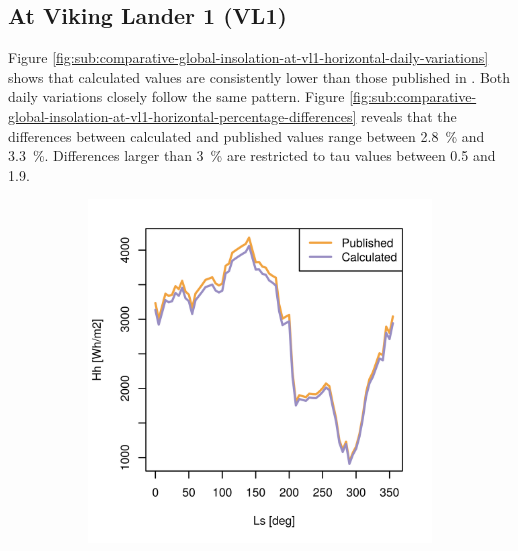 \subsection{At Viking Lander 1 (VL1)}
Figure \ref{fig:sub:comparative-global-insolation-at-vl1-horizontal-daily-variations} shows that calculated values are consistently lower than those published in . Both daily variations closely follow the same pattern. Figure \ref{fig:sub:comparative-global-insolation-at-vl1-horizontal-percentage-differences} reveals that the differences between calculated and published values range between \SI{2.8}{\percent} and \SI{3.3}{\percent}. Differences larger than \SI{3}{\percent} are restricted to tau values between 0.5 and 1.9.

\begin{figure}[H]
\captionsetup[subfigure]{justification=centering}
\vspace{-2ex}
\centering
    \setlength{\subfigureWidth}{0.50\textwidth}
    \setlength{\graphicsHeight}{80mm}
    \hypersetup{hidelinks=true}%
    \begin{subfigure}[t]{\subfigureWidth}
        \centering
            \includegraphics[height=\graphicsHeight]{sections/appendix/A/plots/hh-exp-calc-at-vl1.png}

\end{subfigure}
\end{figure}

